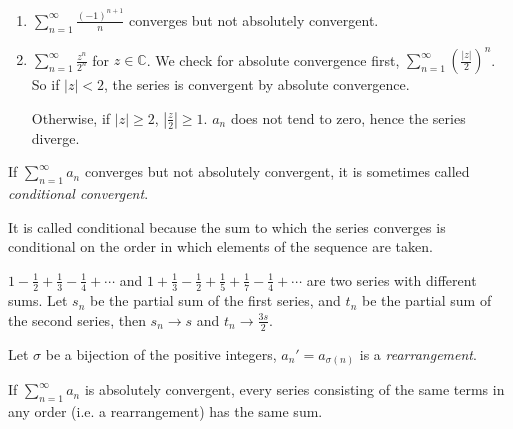 \begin{example}
    \leavevmode
    \begin{enumerate}
        \item \(\sum\limits_{n=1}^{\infty} \frac{(-1)^{n+1}}{n}\) converges but not absolutely convergent.
        \item \(\sum\limits_{n=1}^{\infty} \frac{z^n}{2^n}\) for \(z \in \mathbb{C}\). We check for absolute convergence first, \(\sum\limits_{n=1}^{\infty} \left(\frac{\left\vert z \right\vert}{2}\right)^n\). So if \(\left\vert z \right\vert < 2\), the series is convergent by absolute convergence.

        Otherwise, if \(\left\vert z \right\vert \geq 2\), \(\left\vert \frac{z}{2} \right\vert \geq 1\). \(a_n\) does not tend to zero, hence the series diverge.
    \end{enumerate}
\end{example}
\begin{notation}
    If \(\sum\limits_{n=1}^{\infty} a_n\) converges but not absolutely convergent, it is sometimes called \textit{conditional convergent}.

    It is called conditional because the sum to which the series converges is conditional on the order in which elements of the sequence are taken.
\end{notation}
\begin{example}
    \(1 - \frac{1}{2} + \frac{1}{3} - \frac{1}{4} + \cdots\) and \(1 + \frac{1}{3}-\frac{1}{2}+\frac{1}{5}+\frac{1}{7}-\frac{1}{4}+\cdots\) are two series with different sums. Let \(s_n\) be the partial sum of the first series, and \(t_n\) be the partial sum of the second series, then \(s_n \to s\) and \(t_n \to \frac{3s}{2}\).
\end{example}
\begin{definition}
    Let \(\sigma\) be a bijection of the positive integers, \(a_n' = a_{\sigma(n)}\) is a \textit{rearrangement}.
\end{definition}
\begin{theorem}
    If \(\sum\limits_{n=1}^{\infty} a_n\) is absolutely convergent, every series consisting of the same terms in any order (i.e. a rearrangement) has the same sum.
\end{theorem}
